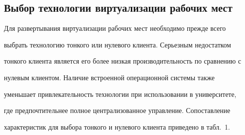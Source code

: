 \vspace*{-3pt}



\subsection{Выбор технологии виртуализации рабочих мест }



\vspace*{-1pt}



  Для развертывания виртуализации рабочих мест необходимо прежде всего 

выбрать технологию тонкого или нулевого клиента. Серьезным недостатком 

тонкого клиента является его более низкая производительность по сравнению с 

нулевым клиентом. Наличие встроенной операционной системы также 

уменьшает привлекательность технологии при использовании в университете, 

где предпочтительнее полное централизованное управление. Сопоставление 

характеристик для выбора тонкого и нулевого клиента приведено в табл.~1.

  

